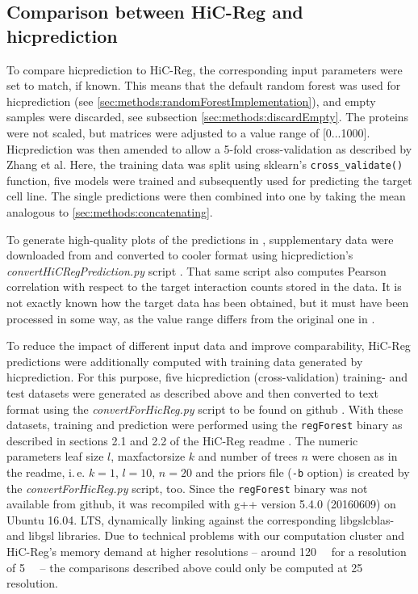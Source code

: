 \subsection{Comparison between HiC-Reg and hicprediction}\label{sec:methods:comparison}
To compare hicprediction to HiC-Reg, the corresponding input parameters were set to match, if known.
This means that the default random forest was used for hicprediction (see \autoref{sec:methods:randomForestImplementation}),
and empty samples were discarded, see subsection \ref{sec:methods:discardEmpty}.
The proteins were not scaled, but matrices were adjusted to a value range of [0...1000].
Hicprediction was then amended to allow a 5-fold cross-validation as described by Zhang et al. 
Here, the training data was split using sklearn's \texttt{cross\_validate()} function,
five models were trained and subsequently used for predicting the target cell line. 
The single predictions were then combined into one by taking the mean analogous to \autoref{sec:methods:concatenating}.

To generate high-quality plots of the predictions in \cite{Zhang2019}, supplementary data
were downloaded from \cite{zhangMaterial01,zhangMaterial02,zhangMaterial03} and converted to cooler format using hicprediction's 
\emph{convertHiCRegPrediction.py} script \cite{Krauth2020}. 
That same script also computes Pearson correlation with respect to the target interaction counts
stored in the data.
It is not exactly known how the target data has been obtained, 
but it must have been processed in some way, 
as the value range differs from the original one in \cite{Rao2014}.

To reduce the impact of different input data and improve comparability, 
HiC-Reg predictions were additionally computed with training data 
generated by hicprediction.
For this purpose, five hicprediction (cross-validation) training- and test datasets were generated as described above and then 
converted to text format using the \emph{convertForHicReg.py} script to be found on github \cite{Krauth2020}.
With these datasets, training and prediction were performed using the \texttt{regForest} binary as 
described in sections 2.1 and 2.2 of the HiC-Reg readme \cite{Roy2020}.
The numeric parameters leaf size $l$, maxfactorsize $k$ and number of trees $n$ were
chosen as in the readme, i.\,e. $k=1$, $l=10$, $n=20$ and 
the priors file (\texttt{-b} option) is created by the \emph{convertForHicReg.py} script, too.
Since the \texttt{regForest} binary was not available from github, it was recompiled
with g++ version 5.4.0 (20160609) on Ubuntu 16.04. LTS, dynamically linking against the
corresponding libgslcblas- and libgsl libraries.
Due to technical problems with our computation cluster and HiC-Reg's memory demand at higher resolutions 
-- around \SI{120}{\giga\byte} for a resolution of \SI{5}{\kilo\bp} -- 
the comparisons described above could only be computed at \SI{25}{\kilo\bp} resolution.

